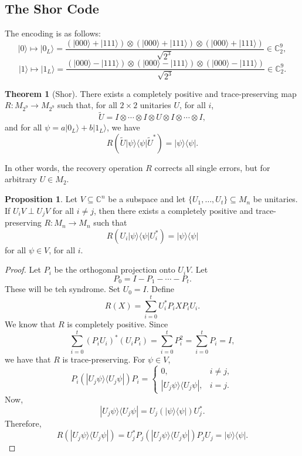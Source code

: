\documentclass[12pt]{article}
\theoremstyle{definition}
\newtheorem*{theorem}{Theorem}
\newtheorem*{proposition}{Proposition}
\newcommand{\C}{\mathbb{C}}
\begin{document}
\subsection{The Shor Code}

The encoding is as follows:
\[
|0\rangle \mapsto |0_L\rangle = \frac{(|000\rangle+|111\rangle)\otimes(|000\rangle+|111\rangle)\otimes(|000\rangle+|111\rangle)}{\sqrt{2^3}} \in \C_2^9,
\]
\[
|1\rangle \mapsto |1_L\rangle = \frac{(|000\rangle-|111\rangle)\otimes(|000\rangle-|111\rangle)\otimes(|000\rangle-|111\rangle)}{\sqrt{2^3}} \in \C_2^9.
\]

\begin{theorem}[Shor]
There exists a completely positive and trace-preserving map $R:M_{2^9} \to M_{2^9}$ such that, for all $2 \times 2$ unitaries $U$, for all $i$,
\[
\widetilde{U}=I \otimes \cdots \otimes I \otimes U \otimes I \otimes \cdots \otimes I,
\]
and for all $\psi=a|0_L\rangle+b|1_L\rangle$, we have
\[
R(\widetilde{U}|\psi\rangle\langle \psi|\widetilde{U}^*)=|\psi\rangle\langle \psi|.
\]
\end{theorem}

In other words, the recovery operation $R$ corrects all single errors, but for arbitrary $U \in M_2$.

\begin{proposition}
Let $V \subseteq \C^n$ be a subspace and let $\{U_1,\ldots,U_t\} \subseteq M_n$ be unitaries. If $U_iV \perp U_jV$ for all $i \neq j$, then there exists a completely positive and trace-preserving $R:M_n \to M_n$ such that
\[
R(U_i|\psi\rangle\langle \psi|U_i^*)=|\psi\rangle\langle \psi|
\]
for all $\psi \in V$, for all $i$.
\end{proposition}

\begin{proof}
Let $P_i$ be the orthogonal projection onto $U_iV$. Let
\[
P_0=I-P_1-\cdots-P_t.
\]
These will be teh syndrome. Set $U_0=I$. Define
\[
R(X)=\sum_{i=0}^t U_i^*P_iXP_iU_i.
\]
We know that $R$ is completely positive. Since
\[
\sum_{i=0}^t (P_iU_i)^*(U_iP_i)=\sum_{i=0}^t P_i^2 = \sum_{i=0}^t P_i = I,
\]
we have that $R$ is trace-preserving. For $\psi \in V$,
\[
P_i(|U_j\psi\rangle\langle U_j\psi|)P_i = \begin{cases}0, & i \neq j,\\ |U_j\psi\rangle\langle U_j\psi|, & i=j.\end{cases}
\]
Now,
\[
|U_j\psi\rangle\langle U_j\psi| = U_j(|\psi\rangle\langle \psi|)U_j^*.
\]
Therefore,
\[
R(|U_j\psi\rangle\langle U_j\psi|)=U_j^*P_j(|U_j\psi\rangle\langle U_j\psi|)P_jU_j = |\psi\rangle\langle \psi|.
\]
\end{proof}
\end{document}
